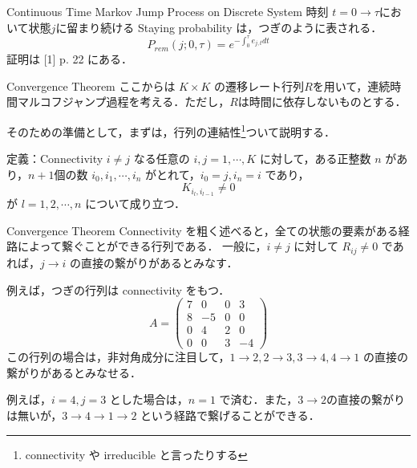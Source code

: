 \documentclass[aspectratio=169, dvipdfmx, 11pt,uplatex]{beamer} %
\begin{document}
\begin{frame}{Continuous Time Markov Jump Process on Discrete System}
  時刻 $t = 0 \to \tau $において状態$j$に留まり続ける Staying probability は，つぎのように表される．
  \begin{equation}
    P_{rem}(j; 0, \tau ) = e^{- \int_0^{\tau } e_{j, t} dt}
  \end{equation}
  証明は [1] p. 22 にある．
\end{frame}

\begin{frame}{Convergence Theorem}
  ここからは $K \times K$ の遷移レート行列$R$を用いて，連続時間マルコフジャンプ過程を考える．ただし，$R$は時間に依存しないものとする．\par
  そのための準備として，まずは，行列の連結性\footnote{connectivity や irreducible と言ったりする}ついて説明する．
  \begin{block}{定義：Connectivity}
    $i \neq j$ なる任意の $i, j = 1, \cdots, K $ に対して，ある正整数 $n$ があり，$n+1$個の数 $i_0, i_1, \cdots, i_n$ がとれて，$i_0 = j, i_n = i$ であり，
    \begin{equation}
      K_{i_l, i_{l-1}} \neq 0
    \end{equation}
    が $l = 1, 2, \cdots, n$ について成り立つ．
  \end{block}
\end{frame}

\begin{frame}{Convergence Theorem}
  Connectivity を粗く述べると，全ての状態の要素がある経路によって繋ぐことができる行列である．
  一般に，$i \neq j$ に対して $R_{ij} \neq 0$ であれば，$j \to i$ の直接の繋がりがあるとみなす．\par
  例えば，つぎの行列は connectivity をもつ．
  \begin{equation}
    A = 
    \begin{pmatrix}
      7 & 0 & 0 & 3 \\
      8 &-5 & 0 & 0 \\
      0 & 4 & 2 & 0 \\
      0 & 0 & 3 &-4
    \end{pmatrix}
  \end{equation}
  この行列の場合は，非対角成分に注目して，$1 \to 2, 2 \to 3, 3 \to 4, 4 \to 1$ の直接の繋がりがあるとみなせる．\par 
  例えば，$i = 4, j  =3$ とした場合は，$n  = 1$ で済む．また，$3 \to 2$の直接の繋がりは無いが，$3 \to 4 \to 1 \to 2$ という経路で繋げることができる．
\end{frame}
\end{document}
